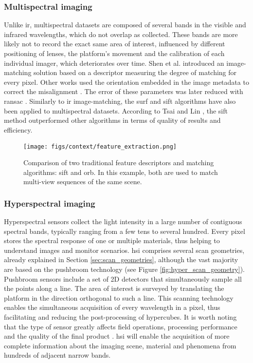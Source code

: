 \subsubsection{Multispectral imaging}

Unlike \acrshort{ir}, multispectral datasets are composed of several bands in the visible and infrared wavelengths, which do not overlap as collected. These bands are more likely not to record the exact same area of interest, influenced by different positioning of lenses, the platform's movement and the calibration of each individual imager, which deteriorates over time. Shen et al. \cite{shen_multi-modal_2014} introduced an image-matching solution based on a descriptor measuring the degree of matching for every pixel. Other works used the orientation embedded in the image metadata to correct the misalignment \cite{jhan_band--band_2016}. The error of these parameters was later reduced with \acrshort{ransac} \cite{jhan_investigation_2017}. Similarly to \acrshort{ir} image-matching, the \acrshort{surf} \cite{sedaghat_high-resolution_2019} and \acrshort{sift} \cite{saleem_robust_2014} algorithms have also been applied to multispectral datasets. According to Tsai and Lin \cite{tsai_accelerated_2017}, the \acrshort{sift} method outperformed other algorithms in terms of quality of results and efficiency.

\begin{figure}[ht]
	\texttt{[image: figs/context/feature\_extraction.png]}
	\caption{Comparison of two traditional feature descriptors and matching algorithms: \acrshort{sift} and  \acrshort{orb}. In this example, both are used to match multi-view sequences of the same scene.}
    \label{fig:feature_descriptors}
\end{figure}

\subsubsection{Hyperspectral imaging}

Hyperspectral sensors collect the light intensity in a large number of contiguous spectral bands, typically ranging from a few tens to several hundred. Every pixel stores the spectral response of one or multiple materials, thus helping to understand images and monitor scenarios. \acrshort{hsi} comprises several scan geometries, already explained in Section \ref{sec:scan_geometries}, although the vast majority are based on the pushbroom technology (see Figure \ref{fig:hyper_scan_geometry}). Pushbroom sensors include a set of 2D detectors that simultaneously sample all the points along a line. The area of interest is surveyed by translating the platform in the direction orthogonal to such a line. This scanning technology enables the simultaneous acquisition of every wavelength in a pixel, thus facilitating and reducing the post-processing of hypercubes. It is worth noting that the type of sensor greatly affects field operations, processing performance and the quality of the final product \cite{adao_hyperspectral_2017}. \acrshort{hsi} will enable the acquisition of more complete information about the imaging scene, material and phenomena from hundreds of adjacent narrow bands.

